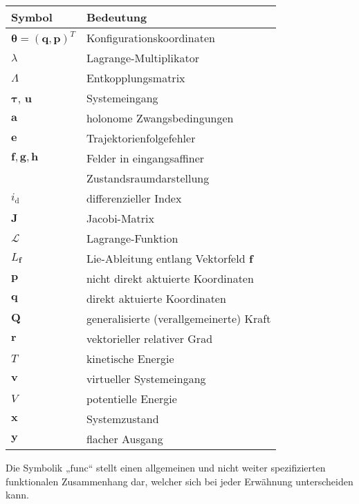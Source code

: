 \begin{table}[htbp]%
	\centering
	\begin{tabular}{ l l } 
		\toprule
		Symbol & Bedeutung \\ 
		\hline
		$\boldsymbol{\theta} = (\mathbf{q}, \mathbf{p})^T$ & Konfigurationskoordinaten \\
		$\lambda$ & Lagrange-Multiplikator \\
		$\Lambda$ & Entkopplungsmatrix \\
		$\boldsymbol{\tau}$, $\mathbf{u}$ & Systemeingang \\
		$\mathbf{a}$ & holonome Zwangsbedingungen \\
		$\mathbf{e}$ & Trajektorienfolgefehler \\
		$\mathbf{f}, \mathbf{g}, \mathbf{h}$ & Felder in eingangsaffiner\\
		& Zustandsraumdarstellung\\
		$i_{\mathrm{d}}$ & differenzieller Index \\
		$\mathbf{J}$ & Jacobi-Matrix \\
		$\mathcal{L}$ & Lagrange-Funktion \\
		$L_{\mathbf{f}}$ & Lie-Ableitung entlang Vektorfeld $\mathbf{f}$\\
		$\mathbf{p}$ & nicht direkt aktuierte Koordinaten \\
		$\mathbf{q}$ & direkt aktuierte Koordinaten \\
		$\mathbf{Q}$ & generalisierte (verallgemeinerte) Kraft\\
		$\mathbf{r}$ & vektorieller relativer Grad \\
		$T$ & kinetische Energie \\
		$\mathbf{v}$ & virtueller Systemeingang \\
		$V$ & potentielle Energie \\
		$\mathbf{x}$ & Systemzustand \\
		$\mathbf{y}$ & flacher Ausgang \\
		\bottomrule
	\end{tabular}
\end{table}

Die Symbolik „$\mathrm{func}$“ stellt einen allgemeinen und nicht weiter spezifizierten funktionalen Zusammenhang dar, welcher sich bei jeder Erwähnung unterscheiden kann.